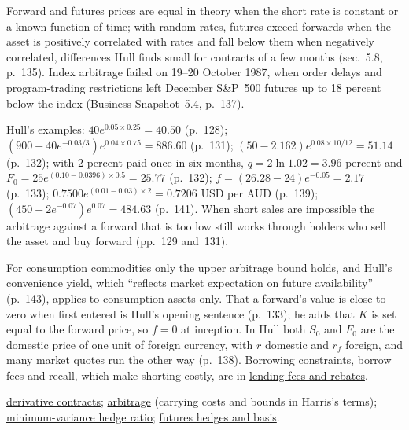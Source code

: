 \begin{qfresult}
Forward and futures prices are equal in theory when the short rate is constant or a known function of time; with random rates, futures exceed forwards when the asset is positively correlated with rates and fall below them when negatively correlated, differences Hull finds small for contracts of a few months (sec.~5.8, p.~135). Index arbitrage failed on 19--20 October 1987, when order delays and program-trading restrictions left December S\&P~500 futures up to 18 percent below the index (Business Snapshot~5.4, p.~137).

 Hull's examples: $40e^{0.05\times0.25}=40.50$ (p.~128); $(900-40e^{-0.03/3})e^{0.04\times0.75}=886.60$ (p.~131); $(50-2.162)e^{0.08\times10/12}=51.14$ (p.~132); with 2 percent paid once in six months, $q=2\ln1.02=3.96$ percent and $F_0=25e^{(0.10-0.0396)\times0.5}=25.77$ (p.~132); $f=(26.28-24)e^{-0.05}=2.17$ (p.~133); $0.7500e^{(0.01-0.03)\times2}=0.7206$ USD per AUD (p.~139); $(450+2e^{-0.07})e^{0.07}=484.63$ (p.~141). When short sales are impossible the arbitrage against a forward that is too low still works through holders who sell the asset and buy forward (pp.~129 and~131).

 For consumption commodities only the upper arbitrage bound holds, and Hull's convenience yield, which ``reflects market expectation on future availability'' (p.~143), applies to consumption assets only. That a forward's value is close to zero when first entered is Hull's opening sentence (p.~133); he adds that $K$ is set equal to the forward price, so $f=0$ at inception. In Hull both $S_0$ and $F_0$ are the domestic price of one unit of foreign currency, with $r$ domestic and $r_f$ foreign, and many market quotes run the other way (p.~138). Borrowing constraints, borrow fees and recall, which make shorting costly, are in \hyperref[def:securities-lending-fee-rebate]{lending fees and rebates}.

 \hyperref[def:derivative-contracts]{derivative contracts}; \hyperref[def:arbitrage]{arbitrage} (carrying costs and bounds in Harris's terms); \hyperref[mod:minimum-variance-hedge-ratio]{minimum-variance hedge ratio}; \hyperref[def:futures-hedge-basis]{futures hedges and basis}.


\end{qfresult}
